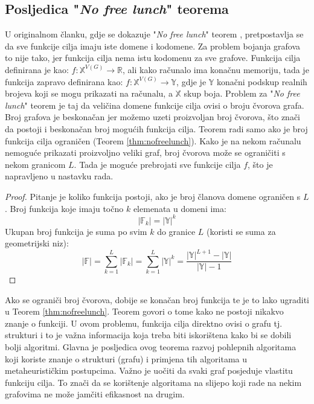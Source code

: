 \documentclass[times, utf8, diplomski, numeric]{fer}
\begin{document}
\subsection{Posljedica "\emph{No free lunch}" teorema}

U originalnom članku, gdje se dokazuje "\emph{No free lunch}" teorem \cite{lit15}, pretpostavlja se da sve funkcije cilja imaju iste domene i kodomene. Za problem bojanja grafova to nije tako, jer funkcija cilja nema istu kodomenu za sve grafove. Funkcija cilja definirana je kao: $f:\mathbb{X}^{V(G)} \rightarrow \mathbb{R}$, ali kako računalo ima konačnu memoriju, tada je funkcija zapravo definirana kao: $f:\mathbb{X}^{V(G)} \rightarrow \mathbb{Y}$, gdje je $\mathbb{Y}$ konačni podskup realnih brojeva koji se mogu prikazati na računalu, a $\mathbb{X}$ skup boja. Problem za "\emph{No free lunch}" teorem je taj da veličina domene funkcije cilja ovisi o broju čvorova grafa. Broj grafova je beskonačan jer možemo uzeti proizvoljan broj čvorova, što znači da postoji i beskonačan broj mogućih funkcija cilja. Teorem radi samo ako je broj funkcija cilja ograničen (Teorem \ref{thm:nofreelunch}). Kako je na nekom računalu nemoguće prikazati proizvoljno veliki graf, broj čvorova može se ograničiti s nekom granicom $L$. Tada je moguće prebrojati sve funkcije cilja $f$, što je napravljeno u nastavku rada.

\begin{proof}
Pitanje je koliko funkcija postoji, ako je broj članova domene ograničen s $L$.
Broj funkcija koje imaju točno $k$ elemenata u domeni ima:
	\begin{equation}
		|\mathbb{F}_k| = |\mathbb{Y}|^k
	\end{equation}
Ukupan broj funkcija je suma po svim $k$ do granice $L$ (koristi se suma za geometrijski niz):
	\begin{equation}
		|\mathbb{F}| = \sum_{k=1}^{L}|\mathbb{F}_k| = \sum_{k=1}^{L} |\mathbb{Y}|^k = \frac{|\mathbb{Y}|^{L+1}-|\mathbb{Y}|}{|\mathbb{Y}|-1}
	\end{equation}
\end{proof} 

Ako se ograniči broj čvorova, dobije se konačan broj funkcija te je to lako ugraditi u Teorem \ref{thm:nofreelunch}. Teorem govori o tome kako ne postoji nikakvo znanje o funkciji. U ovom problemu, funkcija cilja direktno ovisi o grafu tj. strukturi i to je važna informacija koja treba biti iskorištena kako bi se dobili bolji algoritmi. Glavna je posljedica ovog teorema razvoj pohlepnih algoritama koji koriste znanje o strukturi (grafu) i primjena tih algoritama u metaheurističkim postupcima. 
Važno je uočiti da svaki graf posjeduje vlastitu funkciju cilja. To znači da se korištenje algoritama na slijepo koji rade na nekim grafovima ne može jamčiti efikasnost na drugim.
\end{document}
